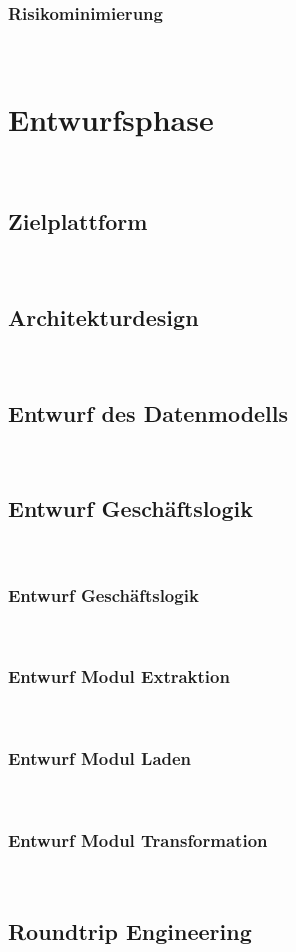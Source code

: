 \documentclass[11pt,toc=sectionentrywithoutdots, headheight=44pt, headings=optiontoheadandtoc]{scrartcl}
\begin{document}
\subsubsection{Risikominimierung}
\blindtext\

\section{Entwurfsphase}
\blindtext\

\subsection{Zielplattform}
\blindtext\

\subsection{Architekturdesign}
\blindtext\

\subsection{Entwurf des Datenmodells}
\blindtext\

\subsection{Entwurf Geschäftslogik}
\blindtext\

\subsubsection{Entwurf Geschäftslogik}
\blindtext\

\subsubsection{Entwurf Modul Extraktion}
\blindtext\

\subsubsection{Entwurf Modul Laden}
\blindtext\

\subsubsection{Entwurf Modul Transformation}
\blindtext\

\subsection{Roundtrip Engineering}
\blindtext\
\end{document}
